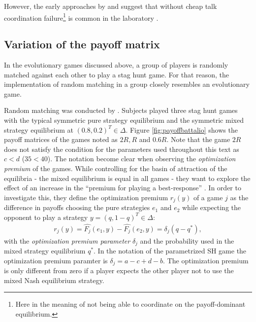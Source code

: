However, the 
early approaches by \textcite{cooper_communication_1992} and
\textcite{van_huyck_tacit_1990} suggest that without cheap talk 
coordination failure\footnote{Here in the meaning of not being able to coordinate on the payoff-dominant equilibrium.} 
is common in the laboratory \parencite[2]{devetag_when_2007}. 

\subsection{Variation of the payoff matrix}
In the evolutionary games discussed above, a group of players is randomly
matched against each other to play a stag hunt game. For that reason, the
implementation of random matching in a group closely resembles an 
evolutionary game.

Random matching was conducted by \textcite{battalio_optimization_2001}. 
Subjects played three stag hunt games with the typical symmetric pure strategy
equilibrium and the symmetric mixed strategy equilibrium at $(0.8,0.2)^T \in
\Delta$. Figure \ref{fig:payoffbattalio} shows the payoff matrices of the
games noted as $2R, R$ and $0.6R$. Note that the game $2R$ does not satisfy the
condition for the parameters used throughout this text as $c<d$ ($35<40$).
The notation become clear when observing the 
\textit{optimization premium} of the games. While controlling for the basin of 
attraction of the equilibria - the mixed equilibrium is equal in all games -
they want to explore the effect of an increase in the ``premium for playing
a best-response'' \parencite[751]{battalio_optimization_2001}. 
In order to investigate this, they define the optimization premium $r_j(y)$ of 
a game $j$ as the difference in payoffs choosing the pure strategies 
$e_1$ and $e_2$ while expecting the opponent to play a strategy 
$y=(q,1-q)^T \in \Delta$:
\begin{align}
        r_j(y)= \hat{F_j}(e_1,y) - \hat{F_j}(e_2,y) = \delta_j(q-q^*),
\end{align}
with the \textit{optimization premium parameter} $\delta_j$ and the 
probability used in the mixed strategy equilibrium $q^*$. In the notation
of the parametrized SH game the optimization premium paramter is 
$\delta_j = a - c + d - b$. The optimization
premium is only different from zero if a player expects the other player not
to use the mixed Nash equilibrium strategy.

